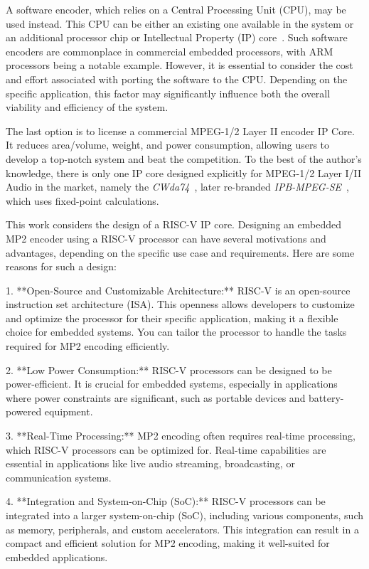 A software encoder, which relies on a Central Processing Unit (CPU), may be used instead. This CPU can be either an existing one available in the system or an additional processor chip or Intellectual Property (IP) core~\cite{ipcore}. Such software encoders are commonplace in commercial embedded processors, with ARM processors being a notable example. However, it is essential to consider the cost and effort associated with porting the software to the CPU. Depending on the specific application, this factor may significantly influence both the overall viability and efficiency of the system.

The last option is to license a commercial MPEG-1/2 Layer II encoder IP Core. It reduces area/volume, weight, and power consumption, allowing users to develop a top-notch system and beat the competition. To the best of the author's knowledge, there is only one IP core designed explicitly for MPEG-1/2 Layer I/II Audio in the market, namely the \textit{CWda74}~\cite{CWda74}, later re-branded \textit{IPB-MPEG-SE}~\cite{ipb-mpeg-se}, which uses fixed-point calculations.

This work considers the design of a RISC-V IP core. Designing an embedded MP2 encoder using a RISC-V processor can have several motivations and advantages, depending on the specific use case and requirements. Here are some reasons for such a design:

1. **Open-Source and Customizable Architecture:** RISC-V is an open-source instruction set architecture (ISA). This openness allows developers to customize and optimize the processor for their specific application, making it a flexible choice for embedded systems. You can tailor the processor to handle the tasks required for MP2 encoding efficiently.

2. **Low Power Consumption:** RISC-V processors can be designed to be power-efficient. It  is crucial for embedded systems, especially in applications where power constraints are significant, such as portable devices and battery-powered equipment.

3. **Real-Time Processing:** MP2 encoding often requires real-time processing, which RISC-V processors can be optimized for. Real-time capabilities are essential in applications like live audio streaming, broadcasting, or communication systems.

4. **Integration and System-on-Chip (SoC):** RISC-V processors can be integrated into a larger system-on-chip (SoC), including various components, such as memory, peripherals, and custom accelerators. This integration can result in a compact and efficient solution for MP2 encoding, making it well-suited for embedded applications.

